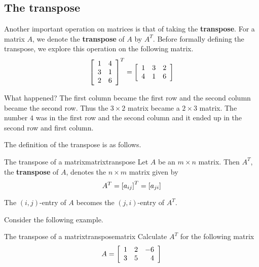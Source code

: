 \subsection{The transpose}

Another important operation on matrices is that of taking the \textbf{transpose}. For a matrix $A$, we denote the
\textbf{transpose} of $A$ by $A^T$. Before formally defining the transpose, we explore this
operation on the following matrix.
\begin{equation*}
\left[
\begin{array}{cc}
1 & 4 \\
3 & 1 \\
2 & 6
\end{array}
\right] ^{T}=\allowbreak \left[
\begin{array}{ccc}
1 & 3 & 2 \\
4 & 1 & 6
\end{array}
\right]
\end{equation*}

What happened? The first column became the first row and the second column
became the second row. Thus the $3\times 2$ matrix became a $2\times 3$
matrix. The number $4$ was in the first row and the second column and it
ended up in the second row and first column. 

The definition of the transpose is as follows.

\begin{definition}{The transpose of a matrix}{matrixtranspose}
Let $A$ be an $m\times n$ matrix. Then $A^{T}$, the \textbf{transpose} of $A$,  denotes the $n\times m$
matrix given by 
\begin{equation*}
A^{T} = \left[ a _{ij}\right] ^{T}= \left[ a_{ji} \right]
\end{equation*}
\end{definition}

The $\left( i, j  \right)$-entry of $A$ becomes the 
$\left( j,i \right)$-entry of $A^T$. 

Consider the following example.

\begin{example}{The transpose of a matrix}{transposematrix}
Calculate $A^T$ for the following matrix
\begin{equation*}
A = \left[
\begin{array}{rrr}
1 & 2 & -6 \\
3 & 5 & 4
\end{array}
\right]
\end{equation*}
\end{example}


